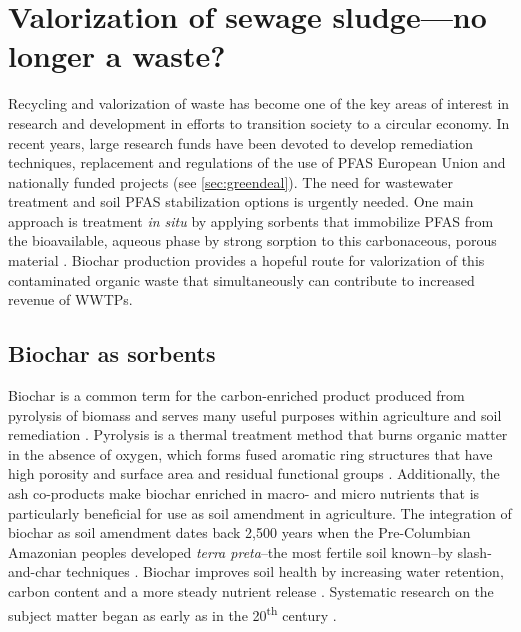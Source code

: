 \section{Valorization of sewage sludge---no longer a waste?}
Recycling and valorization of waste has become one of the key areas of interest in research and development in efforts to transition society to a circular economy. In recent years, large research funds have been devoted to develop remediation techniques, replacement and regulations of the use of PFAS European Union and nationally funded projects (see \cref{sec:greendeal}). The need for wastewater treatment and soil PFAS stabilization options is urgently needed. One main approach is treatment \textit{in situ} by applying sorbents that immobilize PFAS from the bioavailable, aqueous phase by strong sorption to this carbonaceous, porous material \citep{Ahmad2014,Sormo2021,Kupryianchyk2016b}. Biochar production provides a hopeful route for valorization of this contaminated organic waste that simultaneously can contribute to increased revenue of WWTPs.

\subsection{Biochar as sorbents}
Biochar is a common term for the carbon-enriched product produced from pyrolysis of biomass and serves many useful purposes within agriculture and soil remediation \citep{LehmannAndJoseph2015}. Pyrolysis is a thermal treatment method that burns organic matter in the absence of oxygen, which forms fused aromatic ring structures that have high porosity and surface area and residual functional groups \citep{LehmannAndJoseph2015}. Additionally, the ash co-products make biochar enriched in macro- and micro nutrients that is particularly beneficial for use as soil amendment in agriculture. The integration of biochar as soil amendment dates back 2,500 years when the Pre-Columbian Amazonian peoples developed \textit{terra preta}--the most fertile soil known--by slash-and-char techniques \citep{Tindall2017,Ahmad2014}. Biochar improves soil health by increasing water retention, carbon content and a more steady nutrient release \citeauthor{Ahmad2014}. Systematic research on the subject matter began as early as in the 20\textsuperscript{th} century \citep{Retan1915}. 

